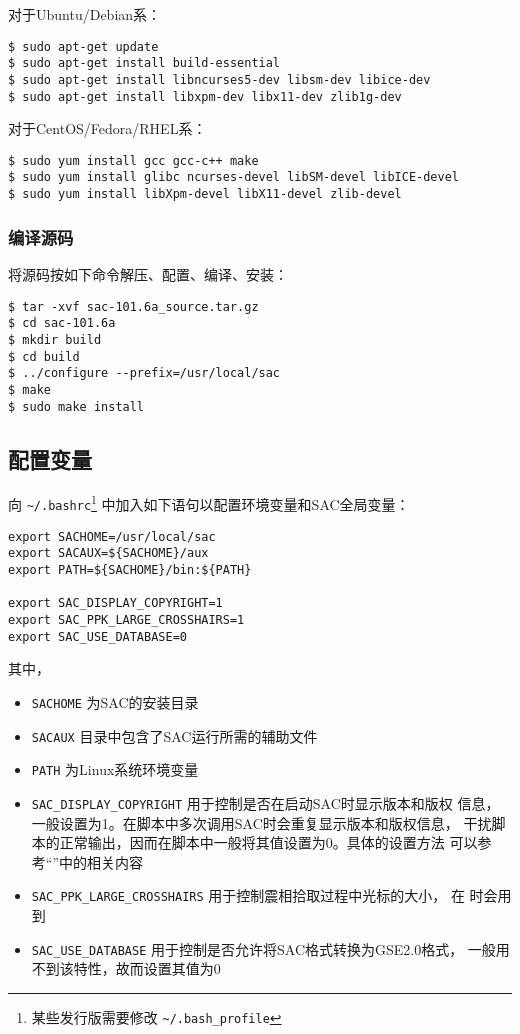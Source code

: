 对于Ubuntu/Debian系：
\begin{verbatim}
$ sudo apt-get update
$ sudo apt-get install build-essential
$ sudo apt-get install libncurses5-dev libsm-dev libice-dev
$ sudo apt-get install libxpm-dev libx11-dev zlib1g-dev
\end{verbatim}

对于CentOS/Fedora/RHEL系：
\begin{verbatim}
$ sudo yum install gcc gcc-c++ make
$ sudo yum install glibc ncurses-devel libSM-devel libICE-devel
$ sudo yum install libXpm-devel libX11-devel zlib-devel
\end{verbatim}

\subsubsection{编译源码}
将源码按如下命令解压、配置、编译、安装：
\begin{verbatim}
$ tar -xvf sac-101.6a_source.tar.gz
$ cd sac-101.6a
$ mkdir build
$ cd build
$ ../configure --prefix=/usr/local/sac
$ make
$ sudo make install
\end{verbatim}

\subsection{配置变量}
向 \verb|~/.bashrc|\footnote{某些发行版需要修改 \verb|~/.bash_profile|}
中加入如下语句以配置环境变量和SAC全局变量：
\begin{verbatim}
export SACHOME=/usr/local/sac
export SACAUX=${SACHOME}/aux
export PATH=${SACHOME}/bin:${PATH}

export SAC_DISPLAY_COPYRIGHT=1
export SAC_PPK_LARGE_CROSSHAIRS=1
export SAC_USE_DATABASE=0
\end{verbatim}

其中，
\begin{itemize}
\item \texttt{SACHOME} 为SAC的安装目录
\item \texttt{SACAUX} 目录中包含了SAC运行所需的辅助文件
\item \texttt{PATH} 为Linux系统环境变量
\item \verb|SAC_DISPLAY_COPYRIGHT| 用于控制是否在启动SAC时显示版本和版权
    信息，一般设置为1。在脚本中多次调用SAC时会重复显示版本和版权信息，
    干扰脚本的正常输出，因而在脚本中一般将其值设置为0。具体的设置方法
    可以参考``''中的相关内容
\item \verb|SAC_PPK_LARGE_CROSSHAIRS| 用于控制震相拾取过程中光标的大小，
    在  时会用到
\item \verb|SAC_USE_DATABASE| 用于控制是否允许将SAC格式转换为GSE2.0格式，
    一般用不到该特性，故而设置其值为0
\end{itemize}

